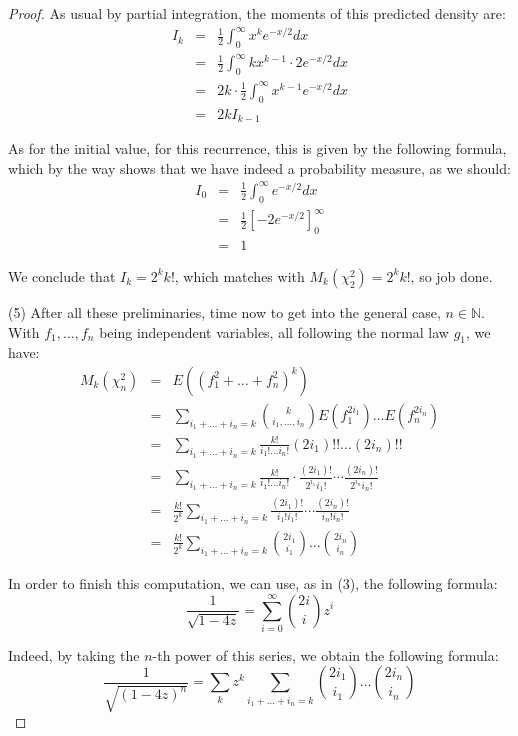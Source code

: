 \documentclass[10pt,a4paper]{amsart}
\begin{document}
\begin{proof}
As usual by partial integration, the moments of this predicted density are:
\begin{eqnarray*}
I_k
&=&\frac{1}{2}\int_0^\infty x^ke^{-x/2}dx\\
&=&\frac{1}{2}\int_0^\infty kx^{k-1}\cdot 2e^{-x/2}dx\\
&=&2k\cdot\frac{1}{2}\int_0^\infty x^{k-1}e^{-x/2}dx\\
&=&2kI_{k-1}
\end{eqnarray*}

As for the initial value, for this recurrence, this is given by the following formula, which by the way shows that we have indeed a probability measure, as we should:
\begin{eqnarray*}
I_0
&=&\frac{1}{2}\int_0^\infty e^{-x/2}dx\\
&=&\frac{1}{2}\left[-2e^{-x/2}\right]_0^\infty\\
&=&1
\end{eqnarray*}

We conclude that $I_k=2^kk!$, which matches with $M_k(\chi_2^2)=2^kk!$, so job done.

\medskip

(5) After all these preliminaries, time now to get into the general case, $n\in\mathbb N$. With $f_1,\ldots,f_n$ being independent variables, all following the normal law $g_1$, we have:
\begin{eqnarray*}
M_k(\chi_n^2)
&=&E((f_1^2+\ldots+f_n^2)^k)\\
&=&\sum_{i_1+\ldots+i_n=k}\binom{k}{i_1,\ldots,i_n}E(f_1^{2i_1})\ldots E(f_n^{2i_n})\\
&=&\sum_{i_1+\ldots+i_n=k}\frac{k!}{i_1!\ldots i_n!}(2i_1)!!\ldots(2i_n)!!\\
&=&\sum_{i_1+\ldots+i_n=k}\frac{k!}{i_1!\ldots i_n!}\cdot\frac{(2i_1)!}{2^{i_1}i_1!}\cdots\frac{(2i_n)!}{2^{i_n}i_n!}\\
&=&\frac{k!}{2^k}\sum_{i_1+\ldots+i_n=k}\frac{(2i_1)!}{i_1!i_1!}\cdots\frac{(2i_n)!}{i_n!i_n!}\\
&=&\frac{k!}{2^k}\sum_{i_1+\ldots+i_n=k}\binom{2i_1}{i_1}\ldots\binom{2i_n}{i_n}
\end{eqnarray*}

In order to finish this computation, we can use, as in (3), the following formula:
$$\frac{1}{\sqrt{1-4z}}=\sum_{i=0}^\infty\binom{2i}{i}z^i$$

Indeed, by taking the $n$-th power of this series, we obtain the following formula:
$$\frac{1}{\sqrt{(1-4z)^n}}
=\sum_kz^k\sum_{i_1+\ldots+i_n=k}\binom{2i_1}{i_1}\ldots\binom{2i_n}{i_n}$$


\end{proof}
\end{document}
